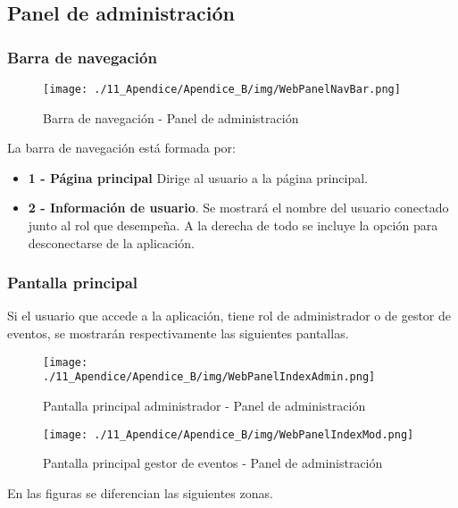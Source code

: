 \subsection{Panel de administración}

\subsubsection*{Barra de navegación}

\begin{figure}[H]
\centering
\texttt{[image: ./11\_Apendice/Apendice\_B/img/WebPanelNavBar.png]}
\caption{Barra de navegación - Panel de administración}
\end{figure}

La barra de navegación está formada por:

\begin{itemize}
	\item \textbf{1 - Página principal} Dirige al usuario a la página principal.
	\item \textbf{2 - Información de usuario}. Se mostrará el nombre del usuario conectado junto al rol que desempeña. A la derecha de todo se incluye la opción para desconectarse de la aplicación.
\end{itemize}


\subsubsection*{Pantalla principal}
Si el usuario que accede a la aplicación, tiene rol de administrador o de gestor de eventos, se mostrarán respectivamente las siguientes pantallas.

\begin{figure}[H]
\centering
\texttt{[image: ./11\_Apendice/Apendice\_B/img/WebPanelIndexAdmin.png]}
\caption{Pantalla principal administrador - Panel de administración}
\end{figure}


\begin{figure}[H]
\centering
\texttt{[image: ./11\_Apendice/Apendice\_B/img/WebPanelIndexMod.png]}
\caption{Pantalla principal gestor de eventos - Panel de administración}
\end{figure}

En las figuras se diferencian las siguientes zonas.


